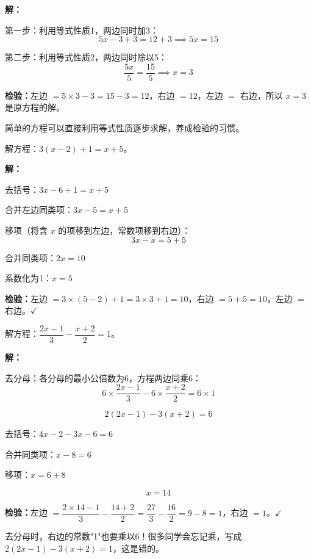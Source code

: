 \documentclass[12pt, a4paper]{ctexart}
\begin{document}
\textbf{解：}

第一步：利用等式性质1，两边同时加3：
$$5x-3+3=12+3 \implies 5x=15$$

第二步：利用等式性质2，两边同时除以5：
$$\frac{5x}{5}=\frac{15}{5} \implies x=3$$

\textbf{检验：}左边 $=5\times 3-3=15-3=12$，右边 $=12$，左边 $=$ 右边，所以 $x=3$ 是原方程的解。

\begin{tipbox}[方法总结]
简单的方程可以直接利用等式性质逐步求解，养成检验的习惯。
\end{tipbox}

\vspace{6pt}

\begin{examplebox}
解方程：$3(x-2)+1=x+5$。
\end{examplebox}

\textbf{解：}

去括号：$3x-6+1=x+5$

合并左边同类项：$3x-5=x+5$

移项（将含 $x$ 的项移到左边，常数项移到右边）：
$$3x-x=5+5$$

合并同类项：$2x=10$

系数化为1：$x=5$

\textbf{检验：}左边 $=3\times(5-2)+1=3\times 3+1=10$，右边 $=5+5=10$，左边 $=$ 右边。$\checkmark$

\vspace{6pt}

\begin{examplebox}[【例题3】易错：去分母时漏乘常数项]
解方程：$\dfrac{2x-1}{3}-\dfrac{x+2}{2}=1$。
\end{examplebox}

\textbf{解：}

去分母：各分母的最小公倍数为6，方程两边同乘6：
$$6\times\frac{2x-1}{3}-6\times\frac{x+2}{2}=6\times 1$$

$$2(2x-1)-3(x+2)=6$$

去括号：$4x-2-3x-6=6$

合并同类项：$x-8=6$

移项：$x=6+8$

$$x=14$$

\textbf{检验：}左边 $=\dfrac{2\times 14-1}{3}-\dfrac{14+2}{2}=\dfrac{27}{3}-\dfrac{16}{2}=9-8=1$，右边 $=1$。$\checkmark$

\begin{warnbox}[易错提醒]
去分母时，右边的常数"1"也要乘以6！很多同学会忘记乘，写成 $2(2x-1)-3(x+2)=1$，这是错的。
\end{warnbox}
\end{document}
